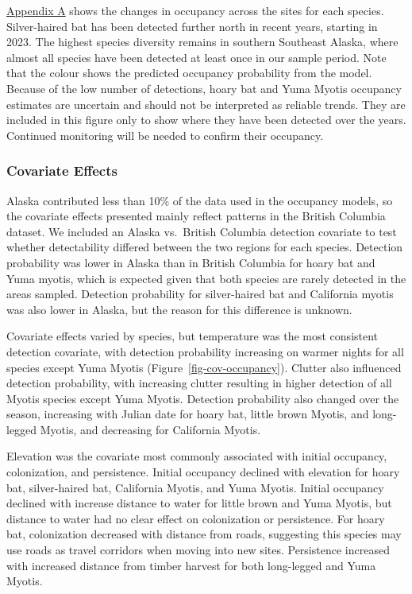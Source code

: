 \documentclass[
  letterpaper,
  DIV=11,
  numbers=noendperiod]{scrartcl}
\begin{document}
{\hyperref[sec-appendix-a]{Appendix A} shows the changes in occupancy
across the sites for each species.} Silver-haired bat has been detected
further north in recent years, starting in 2023. The highest species
diversity remains in southern Southeast Alaska, where almost all species
have been detected at least once in our sample period. Note that the
colour shows the predicted occupancy probability from the model. Because
of the low number of detections, hoary bat and Yuma Myotis occupancy
estimates are uncertain and should not be interpreted as reliable
trends. They are included in this figure only to show where they have
been detected over the years. Continued monitoring will be needed to
confirm their occupancy.

\subsubsection{Covariate Effects}\label{covariate-effects-1}

Alaska contributed less than 10\% of the data used in the occupancy
models, so the covariate effects presented mainly reflect patterns in
the British Columbia dataset. We included an Alaska vs.~British Columbia
detection covariate to test whether detectability differed between the
two regions for each species. Detection probability was lower in Alaska
than in British Columbia for hoary bat and Yuma myotis, which is
expected given that both species are rarely detected in the areas
sampled. Detection probability for silver-haired bat and California
myotis was also lower in Alaska, but the reason for this difference is
unknown.

Covariate effects varied by species, but temperature was the most
consistent detection covariate, with detection probability increasing on
warmer nights for all species except Yuma Myotis
(Figure~\ref{fig-cov-occupancy}). Clutter also influenced detection
probability, with increasing clutter resulting in higher detection of
all Myotis species except Yuma Myotis. Detection probability also
changed over the season, increasing with Julian date for hoary bat,
little brown Myotis, and long-legged Myotis, and decreasing for
California Myotis.

Elevation was the covariate most commonly associated with initial
occupancy, colonization, and persistence. Initial occupancy declined
with elevation for hoary bat, silver-haired bat, California Myotis, and
Yuma Myotis. Initial occupancy declined with increase distance to water
for little brown and Yuma Myotis, but distance to water had no clear
effect on colonization or persistence. For hoary bat, colonization
decreased with distance from roads, suggesting this species may use
roads as travel corridors when moving into new sites. Persistence
increased with increased distance from timber harvest for both
long-legged and Yuma Myotis.
\end{document}
